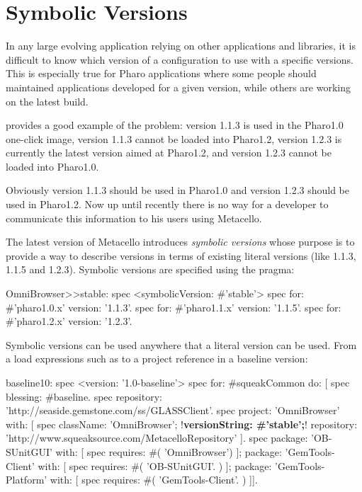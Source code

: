\documentclass[a4paper,10pt,twoside]{book}
\begin{document}
\section{Symbolic Versions}
In any large evolving application relying on other applications and libraries, it is difficult to know which version of a configuration to use with a specific versions. This is especially true for Pharo applications where some people should maintained applications developed for a given version, while others are working on the latest build.

 provides a good example of the problem: 
version 1.1.3 is used in the Pharo1.0 one-click image,  version 1.1.3 cannot be loaded into Pharo1.2,  version 1.2.3 is currently the latest  version aimed at Pharo1.2, and version 1.2.3 cannot be loaded into Pharo1.0. 

Obviously version 1.1.3 should be used in Pharo1.0 and version 1.2.3 should be used in Pharo1.2. Now up until recently there is no way for a developer to communicate this information to his users using Metacello.

The latest version of Metacello introduces \emph{symbolic versions} whose purpose is to provide a way to describe versions in terms of existing literal versions (like 1.1.3, 1.1.5 and 1.2.3). Symbolic versions are specified using the  pragma:

\begin{code}{}
OmniBrowser>>stable: spec
     <symbolicVersion: #'stable'>
     spec for: #'pharo1.0.x' version: '1.1.3'.
     spec for: #'pharo1.1.x' version: '1.1.5'.
     spec for: #'pharo1.2.x' version: '1.2.3'.
\end{code}

Symbolic versions can be used anywhere that a literal version can be used. From a load expressions such as 
to a project reference in a baseline version:

\begin{code}{}
baseline10: spec
  <version: '1.0-baseline'>
  spec for: #squeakCommon do: [
     spec blessing: #baseline.
     spec repository: 'http://seaside.gemstone.com/ss/GLASSClient'.
     spec
        project: 'OmniBrowser' with: [
          spec
             className: 'OmniBrowser';
             !\textbf{versionString: \#'stable';}!
             repository: 'http://www.squeaksource.com/MetacelloRepository' ].
     spec
         package: 'OB-SUnitGUI' with: [
            spec requires: #( 'OmniBrowser') ];
         package: 'GemTools-Client' with: [
            spec requires: #( 'OB-SUnitGUI'. ) ];
         package: 'GemTools-Platform' with: [
            spec requires: #( 'GemTools-Client'. ) ]].
\end{code}
        
\end{document}
